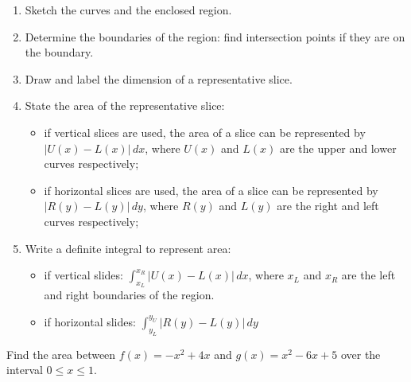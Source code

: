 \begin{enumerate}[sepno]
\item
  Sketch the curves and the enclosed region.
\item
  Determine the boundaries of the region: find intersection points if
  they are on the boundary.
\item
  Draw and label the dimension of a representative slice.
\item
  State the area of the representative slice:

  \begin{itemize}
  \item
    if vertical slices are used, the area of a slice can be represented
    by \(\lvert U(x)-L(x)\rvert\, dx\), where \(U(x)\) and \(L(x)\) are
    the upper and lower curves respectively;
  \item
    if horizontal slices are used, the area of a slice can be
    represented by \(\lvert R(y)-L(y)\rvert\, dy\), where \(R(y)\) and
    \(L(y)\) are the right and left curves respectively;
  \end{itemize}
\item
  Write a definite integral to represent area:

  \begin{itemize}
  \item
    if vertical slides:
    \(\displaystyle\int^{x_R}_{x_L}\lvert U(x)-L(x)\rvert\, dx\), where
    \(x_L\) and \(x_R\) are the left and right boundaries of the region.
  \item
    if horizontal slides:
    \(\displaystyle\int^{y_U}_{y_L}\lvert R(y)-L(y)\rvert\, dy\)
  \end{itemize}
\end{enumerate}

\begin{example}

Find the area between \(f(x)= -x^2+4x\) and \(g(x)=x^2-6x+5\) over the
interval \(0\le x\le 1\).

\end{example}
\vspace*{6\baselineskip}


